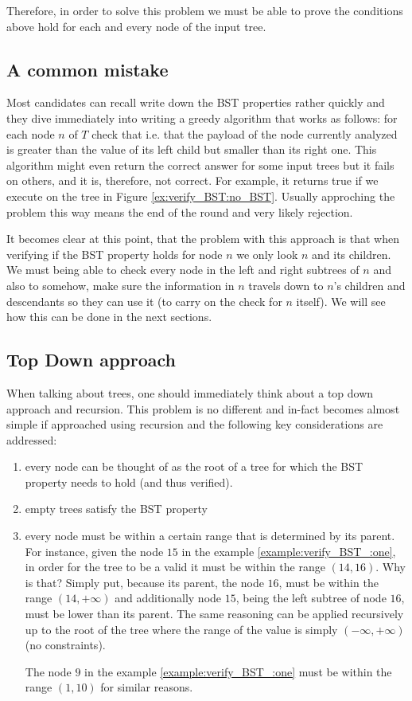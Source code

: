 Therefore, in order to solve this problem we must be able to prove the conditions above hold for each and every node of the input tree. 

\subsection{A common mistake}
Most candidates can recall write down the BST properties rather quickly and they dive immediately into writing a greedy algorithm that works as follows: for each node $n$ of $T$ check that 
 i.e. that the payload of the node currently  analyzed is greater than the value of its left child but smaller than its right one.
This algorithm might even return the correct answer for some input trees but it fails on others, and it is, therefore, not correct.
For example, it returns true if we execute on the tree in Figure \ref{ex:verify_BST:no_BST}.
Usually approching the problem this way means the end of the round and very likely  rejection. 

It becomes clear at this point, that the problem with this approach is that when verifying if the BST property holds for node $n$ we only look $n$ and its children. We must being able to check every node in the left and right subtrees of $n$ and also to somehow, make sure the information in $n$ travels down to $n$'s children and descendants so they can use it (to carry on the check for $n$ itself).
We will see how this can be done in the next sections.

\subsection{Top Down approach}
\label{verify_BST:sec:topdown}
When talking about trees, one should immediately think about a top down approach and recursion. This problem is no different and in-fact  becomes almost simple if approached using recursion and the following key considerations are addressed:
\begin{enumerate}
	\item every node can be thought of as the root of a tree for which the BST property needs to hold (and thus verified). 
	\item empty trees satisfy the BST property
	\item every node must be within a certain range that is determined by its parent. For instance, given the node $15$ in the example \ref{example:verify_BST_:one}, in order for the tree to be a valid it must be within the range $(14,16)$. Why is that? Simply put, because its parent, the node $16$,  must be within the range $(14,+\infty)$ and additionally node $15$, being the left subtree of node $16$, must be lower than its parent. The same reasoning can be applied recursively up to the root of the tree where the range of the value is simply $(-\infty, +\infty)$ (no constraints). 

	The node $9$ in the example \ref{example:verify_BST_:one} must be within the range $(1,10)$ for similar reasons.
\end{enumerate}

